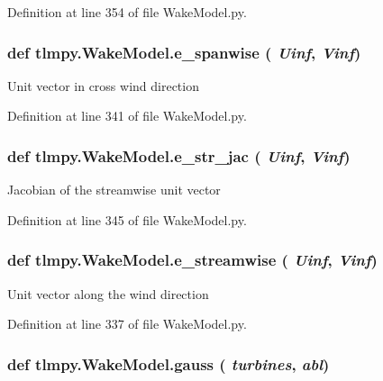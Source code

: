Definition at line 354 of file WakeModel.py.\hypertarget{namespacetlmpy_1_1WakeModel_ae49cae5052af57950bdf818df30d1515}{
\subsubsection[{e\_\-spanwise}]{\setlength{\rightskip}{0pt plus 5cm}def tlmpy.WakeModel.e\_\-spanwise ( {\em Uinf}, \/   {\em Vinf})}}
\label{namespacetlmpy_1_1WakeModel_ae49cae5052af57950bdf818df30d1515}
\begin{DoxyVerb}Unit vector in cross wind direction\end{DoxyVerb}
 

Definition at line 341 of file WakeModel.py.\hypertarget{namespacetlmpy_1_1WakeModel_a571992343123619b79d2879a4bcde946}{
\subsubsection[{e\_\-str\_\-jac}]{\setlength{\rightskip}{0pt plus 5cm}def tlmpy.WakeModel.e\_\-str\_\-jac ( {\em Uinf}, \/   {\em Vinf})}}
\label{namespacetlmpy_1_1WakeModel_a571992343123619b79d2879a4bcde946}
\begin{DoxyVerb}Jacobian of the streamwise unit vector\end{DoxyVerb}
 

Definition at line 345 of file WakeModel.py.\hypertarget{namespacetlmpy_1_1WakeModel_ae02c0817db7ccd19ab4a5e63c5c76afd}{
\subsubsection[{e\_\-streamwise}]{\setlength{\rightskip}{0pt plus 5cm}def tlmpy.WakeModel.e\_\-streamwise ( {\em Uinf}, \/   {\em Vinf})}}
\label{namespacetlmpy_1_1WakeModel_ae02c0817db7ccd19ab4a5e63c5c76afd}
\begin{DoxyVerb}Unit vector along the wind direction\end{DoxyVerb}
 

Definition at line 337 of file WakeModel.py.\hypertarget{namespacetlmpy_1_1WakeModel_a26319d0555ae055b533052cdae00c551}{
\subsubsection[{gauss}]{\setlength{\rightskip}{0pt plus 5cm}def tlmpy.WakeModel.gauss ( {\em turbines}, \/   {\em abl})}}
\label{namespacetlmpy_1_1WakeModel_a26319d0555ae055b533052cdae00c551}


